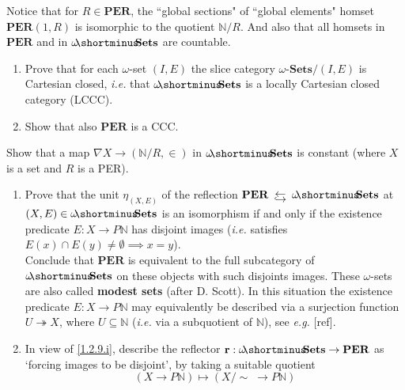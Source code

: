 \documentclass{report}
\newcommand{\bN}[0]{\mathbb N}
\newcommand{\Sets}[0]{\mathbf{Sets}}
\newcommand{\PER}[0]{\mathbf{PER}}
\newcommand{\omgSets}[0]{\omega\!\!\shortminus\!\!\Sets}
\newcommand{\reflective}[0]{\begin{array}{c} \leftarrow \\[-0.25cm] \hookrightarrow\\[-0.1cm]\end{array}}
\begin{document}
\begin{exo}
    Notice that for $R\in \PER$, the ``global sections" of ``global elements" homset $\PER(1,R)$ is
    isomorphic to the quotient $\bN/R$. And also that all homsets in $\PER$ and in $\omgSets$ are
    countable.
\end{exo}

\begin{exo}
    \begin{enumerate}[label=(\roman*)]
        \item Prove that for each $\omega$-set $(I,E)$ the slice category $\omega$-$\Sets/(I,E)$ is
        Cartesian closed, \textit{i.e.} that $\omgSets$ is a locally Cartesian closed category (LCCC).
        \item Show that also $\PER$ is a CCC.
    \end{enumerate}
\end{exo}

\begin{exo}
    Show that a map $\nabla X \to (\bN/R,\in)$ in $\omgSets$ is constant (where $X$ is a set and $R$ is a
    PER).
\end{exo}

\begin{exo}
    \begin{enumerate}[label=(\roman*)]
        \item \label{1.2.9.i} Prove that the unit $\eta_{(X,E)}$ of the reflection
        $\PER\reflective
        \omgSets$ at $(X,E)\in \omgSets$ is an isomorphism if and only if the existence predicate $E : X \to
        P\bN$ has disjoint images (\textit{i.e.} satisfies $E(x)\cap E(y) \neq \emptyset \implies x=y$).\\
        Conclude that $\PER$ is equivalent to the full subcategory of $\omgSets$ on these objects with such
        disjoints images. These $\omega$-sets are also called \textbf{modest sets} (after D. Scott). In this
        situation the existence predicate $E : X \to P\bN$ may equivalently be described via a surjection
        function $U \twoheadrightarrow X$, where $U\subseteq \bN$ (\textit{i.e.} via a subquotient of $\bN$),
        see \textit{e.g.} [ref].
        \item In view of \ref{1.2.9.i}, describe the reflector $\mathbf{r} : \omgSets \to \PER$ as `forcing
        images to be disjoint', by taking a suitable quotient
        $$(X\to P\bN) \mapsto (X/\!\!\sim\; \to P\bN)$$
    \end{enumerate}
\end{exo}
\end{document}
